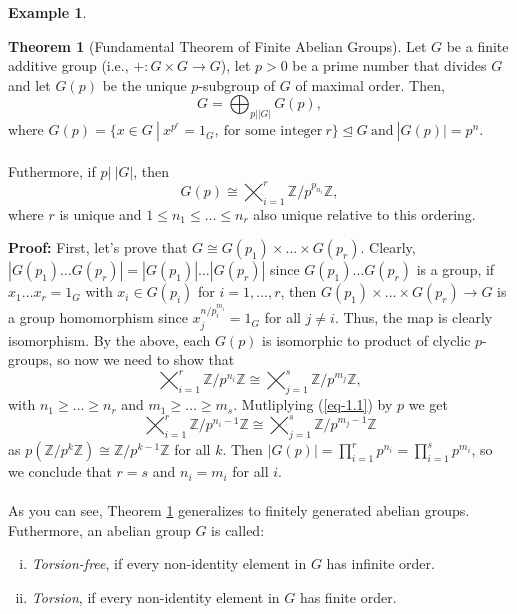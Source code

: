 \documentclass[11pt]{amsbook}%
\newcommand{\ii}{\item}
\theoremstyle{plain}
\theoremstyle{definition}
\newtheorem*{example*}{Example}
\newtheorem{theorem}{Theorem}
\numberwithin{equation}{section}
\newcommand{\ZZ}{\mathbb Z}
\newcommand{\leftnormal}{\trianglelefteq}
\begin{document}
\begin{example*}
\begin{theorem}[Fundamental Theorem of Finite Abelian Groups]
  \label{theo-finite-abelian}
  Let $G$ be a finite additive group (i.e., $+:G \times G \longrightarrow G$),
  let $p > 0$ be a prime number that divides $G$ and let $G(p)$ be the
  unique $p$-subgroup of $G$ of maximal order. Then,
  $$
  G = \bigoplus_{p | |G|} G(p),
  $$
  where $G(p) = \{x \in G \ | \ x^{p^{r}} = 1_{G}, \ \text{for some integer} \ r \} \leftnormal G \ \text{and} \ |G(p)| = p^{n}$. \\ \\
  Futhermore, if $p | \ |G|$, then
  $$
  G(p) \cong \bigtimes_{i=1}^{r} \ZZ/p^{p_{n_{i}}} \ZZ,
  $$
  where $r$ is unique and $1 \leq n_{1} \leq \dots \leq n_{r}$ also
  unique relative to this ordering.
\end{theorem} \vspace{1.8em}
\textbf{Proof: }First, let's prove that $G \cong G(p_{1}) \times \dots \times G(p_{r})$.
Clearly, $|G(p_{1}) \dots G(p_{r})| = |G(p_{1})| \dots |G(p_{r})|$ since $G(p_{1}) \dots G(p_{r})$ is a group,
if $x_{1} \dots x_{r} = 1_{G}$ with $x_{i} \in G(p_{i})$ for $i = 1, \dots, r$, then
$G(p_{1}) \times \dots \times G(p_{r}) \longrightarrow G$ is a group homomorphism since
$x_{j}^{n/p_{i}^{m_{i}}} = 1_{G}$ for all $j \neq i$. Thus, the map is clearly
isomorphism. By the above, each $G(p)$ is isomorphic to product of clyclic
$p$-groups, so now we need to show that
\begin{equation}
  \label{eq-1.1}
  \bigtimes_{i=1}^{r} \ZZ/p^{n_{i}} \ZZ \cong \bigtimes_{j=1}^{s}\ZZ/p^{m_{j}}\ZZ, \tag{*}
\end{equation}
with $n_{1} \geq \dots \geq n_{r}$ and $m_{1} \geq \dots \geq m_{s}$. Mutliplying
(\ref{eq-1.1}) by $p$ we get
$$
  \bigtimes_{i=1}^{r} \ZZ/p^{n_{i}-1} \ZZ \cong \bigtimes_{j=1}^{s}\ZZ/p^{m_{j}-1}\ZZ
$$
as $p(\ZZ/p^{k}\ZZ) \cong \ZZ/p^{k-1}\ZZ$ for all $k$. Then $|G(p)| = \prod_{i=1}^{r} p^{n_{i}} = \prod_{i=1}^{s} p^{m_{i}}$,
so we conclude that $r = s$ and $n_{i} = m_{i}$ for all $i$. \qedsymbol \\ \\
As you can see, Theorem \ref{theo-finite-abelian} generalizes to finitely generated abelian
groups. Futhermore, an abelian group $G$ is called:
\begin{enumerate}[i)]
    \ii \textit{Torsion-free}, if every non-identity element in $G$ has infinite order.
    \ii \textit{Torsion}, if every non-identity element in $G$ has finite order.
\end{enumerate}


\end{example*}
\end{document}

